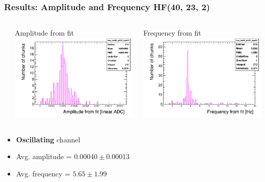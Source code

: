 \documentclass[bigger]{beamer}
\providecommand{\alert}[1]{\textbf{#1}}
\begin{document}
\begin{frame}
\frametitle{Results: Amplitude and Frequency HF(40, 23, 2)}
\label{sec-3-3-6}
\begin{columns} %
\label{sec-3-3-6-1}
\begin{column}{0.55\textwidth}
\label{sec-3-3-6-1-1}

\centering
Amplitude from fit
\includegraphics[width=.9\linewidth]{fig/amp_ieta40_iphi23_depth2.png}
\end{column}
\begin{column}{0.55\textwidth}
\label{sec-3-3-6-1-2}

\centering
Frequency from fit
\includegraphics[width=.9\linewidth]{fig/freq_ieta40_iphi23_depth2.png}
\end{column}
\end{columns}
\begin{itemize}

\item \alert{Oscillating} channel
\label{sec-3-3-6-2}%

\item Avg. amplitude = $0.00040 \pm 0.00013$
\label{sec-3-3-6-3}%

\item Avg. frequency = $5.65 \pm 1.99$
\label{sec-3-3-6-4}%
\end{itemize} %
\end{frame}
\end{document}
